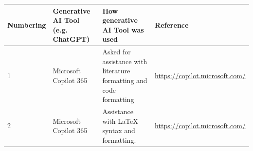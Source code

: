 \documentclass{article}
\begin{document}
\vspace{0.8cm}

\renewcommand{\arraystretch}{1.5}

\begin{tabular}{|p{2cm}|p{3cm}|p{4cm}|p{4cm}|}
\hline
\textbf{Numbering} & \textbf{Generative AI Tool (e.g. ChatGPT)} & \textbf{How generative AI Tool was used} & \textbf{Reference} \\ 
\hline

1 & Microsoft Copilot 365 & 
Asked for assistance with literature formatting and code formatting & 
\url{https://copilot.microsoft.com/} \\ 
\hline

2 & Microsoft Copilot 365 & 
Assistance with LaTeX syntax and formatting. & 
\url{https://copilot.microsoft.com/} \\ 
\hline

\end{tabular}
\end{document}
